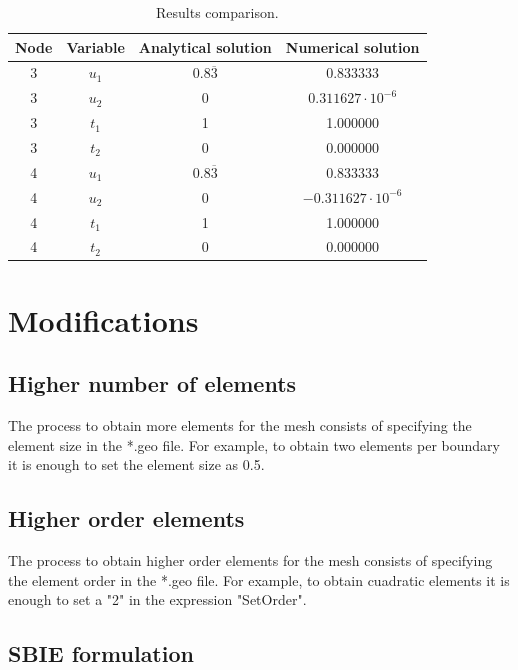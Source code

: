 \documentclass[A4]{article}
\begin{document}
\begin{table}[h]
	\begin{center}
		\begin{tabular}{|*{4}{c}|}
			\hline
			Node & Variable & Analytical solution & Numerical solution \\
			\hline
			3 & $u_1$ & $0.8\overline{3}$ & 0.833333 \\
			\hline
			3 & $u_2$ & 0 & $0.311627\cdot 10^{-6}$ \\
			\hline
			3 & $t_1$ & 1 & 1.000000 \\
			\hline
			3 & $t_2$ & $0$ & 0.000000 \\
			\hline
			4 & $u_1$ & $0.8\overline{3}$ & 0.833333 \\
			\hline
			4 & $u_2$ & 0 & $-0.311627\cdot 10^{-6}$ \\
			\hline
			4 & $t_1$ & 1 & 1.000000 \\
			\hline
			4 & $t_2$ & $0$ & 0.000000 \\
			\hline
		\end{tabular}
	\end{center}
	\caption{Results comparison.}
	\label{tab:square_results}
\end{table}

\section{Modifications}

\subsection{Higher number of elements}

The process to obtain more elements for the mesh consists of specifying the element size in the *.geo file. For example, to obtain two elements per boundary it is enough to set the element size as 0.5.  

\subsection{Higher order elements}

The process to obtain higher order elements for the mesh consists of specifying the element order in the *.geo file. For example, to obtain cuadratic elements it is enough to set a "2" in the expression "SetOrder". 

\subsection{SBIE formulation}
\end{document}
